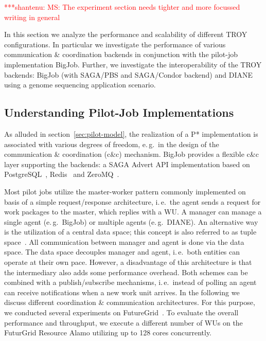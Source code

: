 \documentclass[conference,final]{IEEEtran}
\newcommand{\jhanote}[1]{ {\textcolor{red} { ***shantenu: #1 }}}
\newcommand{\jhanote}[1]{}
\begin{document}
\jhanote{MS: The experiment section needs tighter and more focussed
  writing in general}

In this section we analyze the performance and scalability of different 
TROY configurations. In particular we investigate the performance 
of various communication \& coordination backends in conjunction with the 
pilot-job implementation BigJob. Further, we investigate the interoperability of 
the TROY backends: BigJob (with SAGA/PBS and SAGA/Condor backend) and DIANE 
using a genome sequencing application scenario.

\subsection{Understanding Pilot-Job Implementations}

As alluded in section~\ref{sec:pilot-model}, the realization of a P*
implementation is associated with various degrees of freedom, e.\,g.\ in the
design of the communication \& coordination (c\&c) mechanism. BigJob provides
a flexible c\&c layer supporting the backends: a SAGA Advert API
implementation based on PostgreSQL~\cite{saga_advert}, Redis~\cite{redis} and
ZeroMQ~\cite{zmq}.



Most pilot jobs utilize the master-worker pattern commonly implemented on basis
of a simple request/response architecture, i.\,e.\ the agent sends a request for
work packages to the master, which replies with a WU. A manager can manage a
single agent (e.\,g.\ BigJob) or multiple agents (e.\,g.\ DIANE). An alternative
way is the utilization of a central data space; this concept is also referred to
as tuple space~\cite{Gelernter:1985:GCL:2363.2433}. All communication between
manager and agent is done via the data space. The data space decouples manager
and agent, i.\,e.\ both entities can operate at their own pace. However, a
disadvantage of this architecture is that the intermediary also adds some
performance overhead. Both schemes can be combined with a publish/subscribe
mechanisms, i.\,e.\ instead of polling an agent can receive notifications when a
new work unit arrives. In the following we discuss different coordination \&
communication architectures. For this purpose, we conducted several experiments
on FutureGrid~\cite{fg}. To evaluate the overall performance and throughput, we 
execute a different number of WUs on the FuturGrid Resource Alamo utilizing up 
to 128 cores concurrently.
\end{document}
